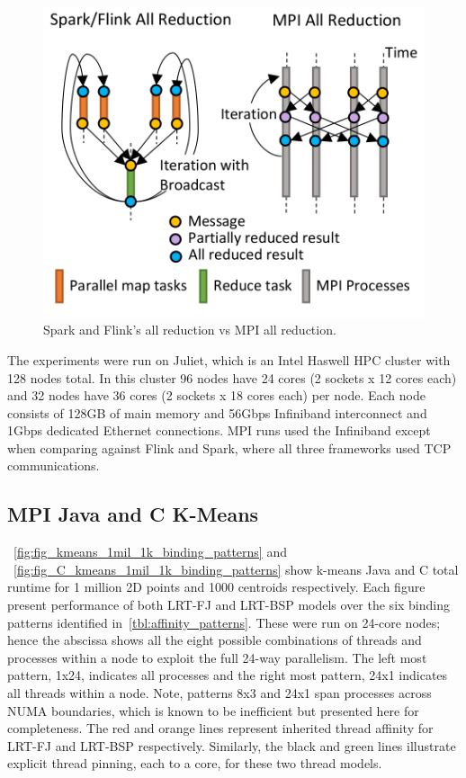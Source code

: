 \documentclass[10pt, conference, compsocconf]{IEEEtran}
\begin{document}
\begin{figure}
    \centering
    \includegraphics[width=0.9\columnwidth]{images/fig_flink_vs_mpi_reduction}
    \caption{Spark and Flink's all reduction vs \ac{MPI} all reduction.}
    \label{fig:fig_flink_vs_mpi_reduction}
\end{figure}



The experiments were run on Juliet, which is an Intel Haswell \ac{HPC} cluster with 128 nodes total. In this cluster 96 nodes have 24 cores (2 sockets x 12 cores each) and 32 nodes have 36 cores (2 sockets x 18 cores each) per node. Each node consists of 128GB of main memory and 56Gbps Infiniband interconnect and 1Gbps dedicated Ethernet connections. \ac{MPI} runs used the Infiniband except when comparing against Flink and Spark, where all three frameworks used \ac{TCP} communications.

\subsection{MPI Java and C K-Means}
\figurename~\ref{fig:fig_kmeans_1mil_1k_binding_patterns} and \figurename~\ref{fig:fig_C_kmeans_1mil_1k_binding_patterns} show k-means Java and C total runtime for 1 million 2D points and 1000 centroids respectively. Each figure present performance of both \ac{LRT-FJ} and \ac{LRT-BSP} models over the six binding patterns identified in~\ref{tbl:affinity_patterns}. These were run on 24-core nodes; hence the abscissa shows all the eight possible combinations of threads and processes within a node to exploit the full 24-way parallelism. The left most pattern, 1x24, indicates all processes and the right most pattern, 24x1 indicates all threads within a node. Note, patterns 8x3 and 24x1 span processes across \ac{NUMA} boundaries, which is known to be inefficient but presented here for completeness. The red and orange lines represent inherited thread affinity for \ac{LRT-FJ} and \ac{LRT-BSP} respectively. Similarly, the black and green lines illustrate explicit thread pinning, each to a core, for these two thread models. 
\end{document}
